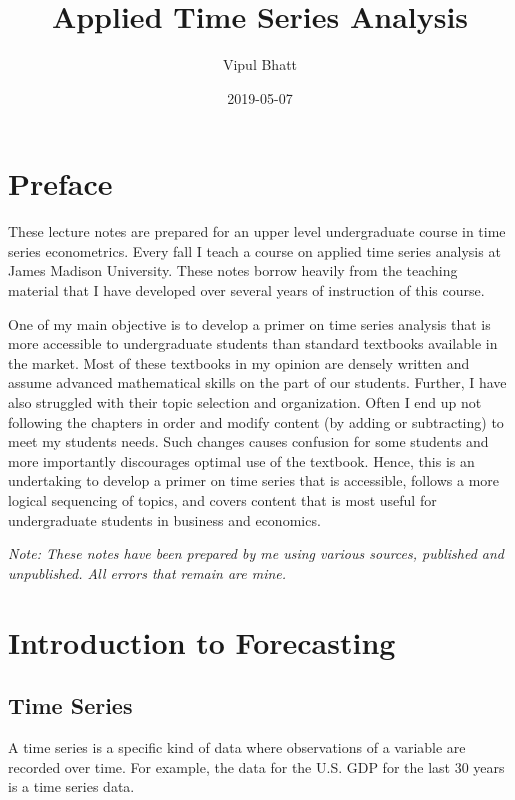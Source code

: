 \documentclass[]{book}
\title{Applied Time Series Analysis}
\author{Vipul Bhatt}
\date{2019-05-07}
\theoremstyle{definition}
\theoremstyle{definition}
\theoremstyle{definition}
\theoremstyle{remark}
\begin{document}
\maketitle

{
\setcounter{tocdepth}{1}
\tableofcontents
}
\hypertarget{preface}{%
\chapter*{Preface}\label{preface}}

These lecture notes are prepared for an upper level undergraduate course in time series econometrics. Every fall I teach a course on applied time series analysis at James Madison University. These notes borrow heavily from the teaching material that I have developed over several years of instruction of this course.

One of my main objective is to develop a primer on time series analysis that is more accessible to undergraduate students than standard textbooks available in the market. Most of these textbooks in my opinion are densely written and assume advanced mathematical skills on the part of our students. Further, I have also struggled with their topic selection and organization. Often I end up not following the chapters in order and modify content (by adding or subtracting) to meet my students needs. Such changes causes confusion for some students and more importantly discourages optimal use of the textbook. Hence, this is an undertaking to develop a primer on time series that is accessible, follows a more logical sequencing of topics, and covers content that is most useful for undergraduate students in business and economics.

\emph{Note: These notes have been prepared by me using various sources, published and unpublished. All errors that remain are mine.}

\hypertarget{intro}{%
\chapter{Introduction to Forecasting}\label{intro}}

\hypertarget{time-series}{%
\section{Time Series}\label{time-series}}

A time series is a specific kind of data where observations of a variable are recorded over time. For example, the data for the U.S. GDP for the last 30 years is a time series data.
\end{document}
